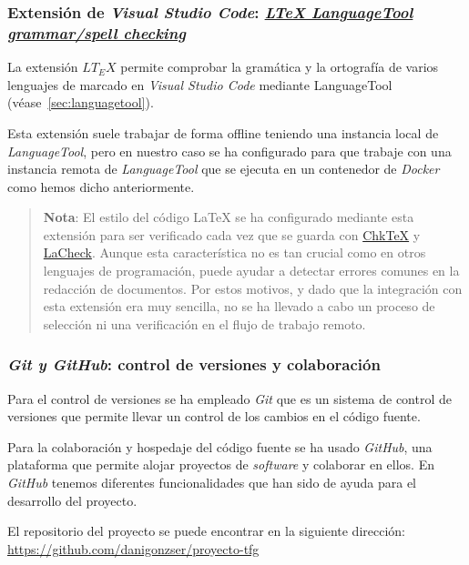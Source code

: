 \subsubsection{Extensión de \textit{Visual Studio Code}: \href{https://github.com/valentjn/vscode-ltex}{\textit{LTeX LanguageTool grammar/spell checking}}}

La extensión \( LT_E X \) permite comprobar la gramática y la ortografía de varios lenguajes de marcado en \textit{Visual Studio Code} mediante LanguageTool (véase~\ref{sec:languagetool}).

Esta extensión suele trabajar de forma offline teniendo una instancia local de \textit{LanguageTool}, pero en nuestro caso se ha configurado para que trabaje con una instancia remota de \textit{LanguageTool} que se ejecuta en un contenedor de \textit{Docker} como hemos dicho anteriormente.

\begin{quote}
    \textbf{Nota}: El estilo del código \LaTeX{} se ha configurado mediante esta extensión para ser verificado cada vez que se guarda con \href{https://www.nongnu.org/chktex/}{ChkTeX} y \href{https://ctan.org/pkg/lacheck}{LaCheck}. Aunque esta característica no es tan crucial como en otros lenguajes de programación, puede ayudar a detectar errores comunes en la redacción de documentos. Por estos motivos, y dado que la integración con esta extensión era muy sencilla, no se ha llevado a cabo un proceso de selección ni una verificación en el flujo de trabajo remoto.
\end{quote}

\subsubsection{\textit{Git y GitHub}: control de versiones y colaboración}

Para el control de versiones se ha empleado \textit{Git} que es un sistema de control de versiones que permite llevar un control de los cambios en el código fuente.

Para la colaboración y hospedaje del código fuente se ha usado \textit{GitHub}, una plataforma que permite alojar proyectos de \textit{software} y colaborar en ellos. En \textit{GitHub} tenemos diferentes funcionalidades que han sido de ayuda para el desarrollo del proyecto.

El repositorio del proyecto se puede encontrar en la siguiente dirección: \url{https://github.com/danigonzser/proyecto-tfg}


